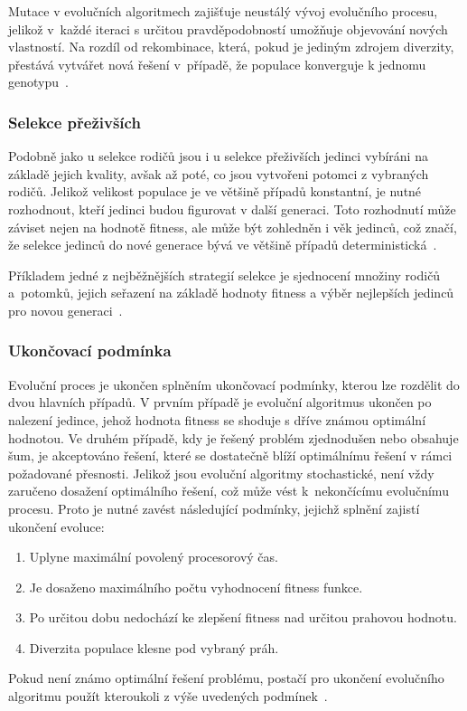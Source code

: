 Mutace v evolučních algoritmech zajišťuje neustálý vývoj evolučního procesu, jelikož v~každé iteraci s určitou pravděpodobností umožňuje objevování nových vlastností. 
Na rozdíl od rekombinace, která, pokud je jediným zdrojem diverzity, přestává vytvářet nová řešení v~případě, že populace konverguje k jednomu genotypu~\cite{NaturalComputing}. 

\subsubsection*{Selekce přeživších}
Podobně jako u selekce rodičů jsou i u selekce přeživších jedinci vybíráni na základě jejich kvality, avšak až poté, co jsou vytvořeni potomci z vybraných rodičů. 
Jelikož velikost populace je ve většině případů konstantní, je nutné rozhodnout, kteří jedinci budou figurovat v další generaci. 
Toto rozhodnutí může záviset nejen na hodnotě fitness, ale může být zohledněn i věk jedinců, což značí, že selekce jedinců do nové generace bývá ve většině případů deterministická~\cite{IntroductionToEvoComputing}. 

Příkladem jedné z nejběžnějších strategií selekce je sjednocení množiny rodičů a~potomků, jejich seřazení na základě hodnoty fitness a výběr nejlepších jedinců pro novou generaci~\cite{IntroductionToEvoComputing}. 

\subsubsection*{Ukončovací podmínka}
Evoluční proces je ukončen splněním ukončovací podmínky, kterou lze rozdělit do dvou hlavních případů. 
V prvním případě je evoluční algoritmus ukončen po nalezení jedince, jehož hodnota fitness se shoduje s dříve známou optimální hodnotou. 
Ve druhém případě, kdy je řešený problém zjednodušen nebo obsahuje šum, je akceptováno řešení, které se dostatečně blíží optimálnímu řešení v rámci požadované přesnosti. 
Jelikož jsou evoluční algoritmy stochastické, není vždy zaručeno dosažení optimálního řešení, což může vést k~nekončícímu evolučnímu procesu.
Proto je nutné zavést následující podmínky, jejichž splnění zajistí ukončení evoluce:
\begin{enumerate}
    \item Uplyne maximální povolený procesorový čas. 
    \item Je dosaženo maximálního počtu vyhodnocení fitness funkce. 
    \item Po určitou dobu nedochází ke zlepšení fitness nad určitou prahovou hodnotu. 
    \item Diverzita populace klesne pod vybraný práh. 
\end{enumerate}
Pokud není známo optimální řešení problému, postačí pro ukončení evolučního algoritmu použít kteroukoli z výše uvedených podmínek~\cite{IntroductionToEvoComputing}. 

